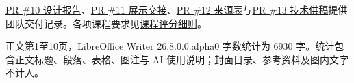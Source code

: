 \documentclass[UTF8,12pt,fontset=none]{ctexart}
\newcommand{\subhead}[1]{\par\addvspace{8pt}{\color{zblue}\fontsize{14}{18}\selectfont\bfseries #1\par}\vspace{1pt}}
\begin{document}
\href{https://github.com/BrockPhlin/industry-report-harness/pull/10}{PR \#10 设计报告}、\href{https://github.com/BrockPhlin/industry-report-harness/pull/11}{PR \#11 展示交接}、\href{https://github.com/BrockPhlin/industry-report-harness/pull/12}{PR \#12 来源表}与\href{https://github.com/BrockPhlin/industry-report-harness/pull/13}{PR \#13 技术供稿}提供团队交付记录。各项课程要求见\href{https://github.com/BrockPhlin/industry-report-harness/blob/7876b7c/materials/references/\%E8\%AF\%BE\%E7\%A8\%8B\%E6\%8A\%A5\%E5\%91\%8A\%E4\%B8\%8E\%E8\%AF\%84\%E5\%88\%86\%E7\%BB\%86\%E5\%88\%99.md}{课程评分细则}。\par
\subhead{篇幅统计}
正文第1至10页，LibreOffice Writer 26.8.0.0.alpha0 字数统计为 6930 字。统计包含正文标题、段落、表格、图注与 AI 使用说明；封面目录、参考资料及图内文字不计入。
\end{document}
